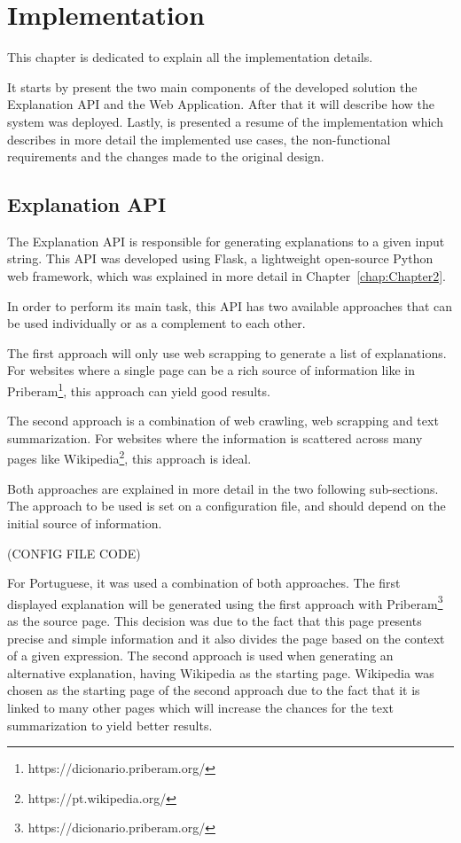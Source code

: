 
\chapter{Implementation} %
\label{chap:Chapter5}

This chapter is dedicated to explain all the implementation details.

It starts by present the two main components of the developed solution the Explanation API and the Web Application.
After that it will describe how the system was deployed.
Lastly, is presented a resume of the implementation which describes in more detail the implemented use cases, the non-functional requirements and the changes made to the original design.

\section{Explanation API}

The Explanation API is responsible for generating explanations to a given input string.
This API was developed using Flask, a lightweight open-source Python web framework, which was explained in more detail in Chapter~\ref{chap:Chapter2}.

In order to perform its main task, this API has two available approaches that can be used individually or as a complement to each other.

The first approach will only use web scrapping to generate a list of explanations.
For websites where a single page can be a rich source of information like in Priberam\footnote{https://dicionario.priberam.org/}, this approach can yield good results.

The second approach is a combination of web crawling, web scrapping and text summarization.
For websites where the information is scattered across many pages like Wikipedia\footnote{https://pt.wikipedia.org/}, this approach is ideal.

Both approaches are explained in more detail in the two following sub-sections.
The approach to be used is set on a configuration file, and should depend on the initial source of information.

(CONFIG FILE CODE) %

For Portuguese, it was used a combination of both approaches.
The first displayed explanation will be generated using the first approach with Priberam\footnote{https://dicionario.priberam.org/} as the source page.
This decision was due to the fact that this page presents precise and simple information and it also divides the page based on the context of a given expression.
The second approach is used when generating an alternative explanation, having Wikipedia as the starting page.
Wikipedia was chosen as the starting page of the second approach due to the fact that it is linked to many other pages which will increase the chances for the text summarization to yield better results.

